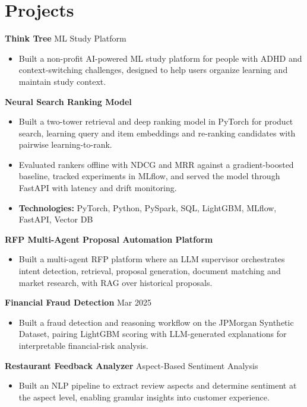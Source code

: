 \documentclass[10pt,a4paper]{article}
\begin{document}
\section{Projects}
\textbf{Think Tree} \textbar{} ML Study Platform\par
\begin{itemize}
  \item Built a non-profit AI-powered ML study platform for people with ADHD and context-switching challenges, designed to help users organize learning and maintain study context.
\end{itemize}
\textbf{Neural Search Ranking Model}\par
\begin{itemize}
  \item Built a two-tower retrieval and deep ranking model in PyTorch for product search, learning query and item embeddings and re-ranking candidates with pairwise learning-to-rank.
  \item Evaluated rankers offline with NDCG and MRR against a gradient-boosted baseline, tracked experiments in MLflow, and served the model through FastAPI with latency and drift monitoring.
  \item \textbf{Technologies:} PyTorch, Python, PySpark, SQL, LightGBM, MLflow, FastAPI, Vector DB
\end{itemize}
\textbf{RFP Multi-Agent Proposal Automation Platform}\par
\begin{itemize}
  \item Built a multi-agent RFP platform where an LLM supervisor orchestrates intent detection, retrieval, proposal generation, document matching and market research, with RAG over historical proposals.
\end{itemize}
\textbf{Financial Fraud Detection} \textbar{} Mar 2025\par
\begin{itemize}
  \item Built a fraud detection and reasoning workflow on the JPMorgan Synthetic Dataset, pairing LightGBM scoring with LLM-generated explanations for interpretable financial-risk analysis.
\end{itemize}
\textbf{Restaurant Feedback Analyzer} \textbar{} Aspect-Based Sentiment Analysis\par
\begin{itemize}
  \item Built an NLP pipeline to extract review aspects and determine sentiment at the aspect level, enabling granular insights into customer experience.
\end{itemize}
\end{document}

